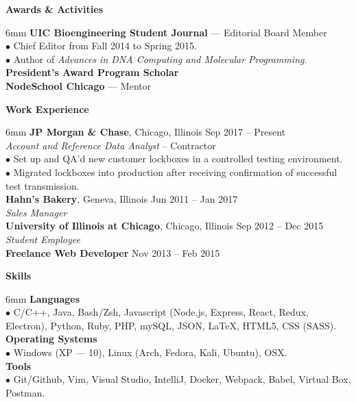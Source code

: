 \documentclass[11pt]{article}
\newcommand{\sectionheader}[1]{\noindent \textbf{\large #1}}
\newenvironment{sectionbody}{\begin{adjustwidth}{6mm}{}}{\end{adjustwidth}}
\begin{document}
\vspace{2mm}

\sectionheader{Awards \& Activities}
\begin{sectionbody}
{\bf UIC Bioengineering Student Journal} --- Editorial Board Member \\
$\bullet$ Chief Editor from Fall 2014 to Spring 2015. \\
$\bullet$ Author of {\it Advances in DNA Computing and Molecular Programming}. \\
{\bf President's Award Program Scholar} \\
{\bf NodeSchool Chicago} --- Mentor
\end{sectionbody}

\vspace{2mm}

\sectionheader{Work Experience}
\begin{sectionbody}
{\bf JP Morgan \& Chase}, Chicago, Illinois \hfill Sep 2017 -- Present \\
    \textit{Account and Reference Data Analyst} -- Contractor \\
$\bullet$ Set up and QA'd new customer lockboxes in a controlled testing environment. \\
$\bullet$ Migrated lockboxes into production after receiving confirmation of successful test transmission.\\
{\bf Hahn's Bakery}, Geneva, Illinois \hfill Jun 2011 -- Jan 2017 \\
\textit{Sales Manager} \\
{\bf University of Illinois at Chicago}, Chicago, Illinois \hfill Sep 2012 -- Dec 2015 \\
\textit{Student Employee} \\
{\bf Freelance Web Developer} \hfill Nov 2013 -- Feb 2015
\end{sectionbody}

\vspace{2mm}

\sectionheader{Skills}
\begin{sectionbody}
{\bf Languages} \\
$\bullet$ C/C++, Java, Bash/Zsh, Javascript (Node.js, Express, React, Redux, Electron), Python, Ruby, PHP, mySQL, JSON, \LaTeX, HTML5, CSS (SASS). \\
{\bf Operating Systems} \\
$\bullet$ Windows (XP --- 10), Linux (Arch, Fedora, Kali, Ubuntu), OSX. \\
{\bf Tools} \\
$\bullet$ Git/Github, Vim, Visual Studio, IntelliJ, Docker, Webpack, Babel, Virtual Box, Postman.
\end{sectionbody}
\end{document}
